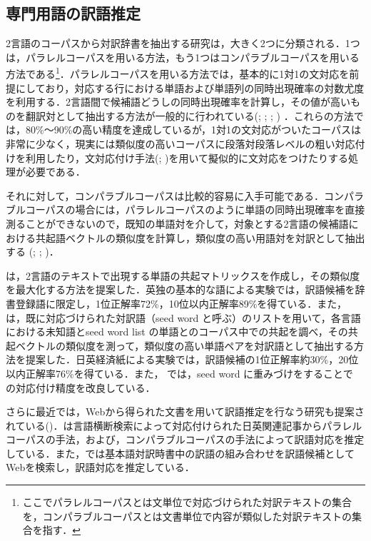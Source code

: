 \documentclass[japanese]{jnlp_1.3e}
\begin{document}
\subsection{専門用語の訳語推定}

2言語のコーパスから対訳辞書を抽出する研究は，大きく2つに分類される．1つは，パラレルコーパスを用いる方法，もう1つはコンパラブルコーパスを用いる方法である\footnote{ここでパラレルコーパスとは文単位で対応づけられた対訳テキストの集合を，コンパラブルコーパスとは文書単位で内容が類似した対訳テキストの集合を指す．}．パラレルコーパスを用いる方法では，基本的に1対1の文対応を前提にしており，対応する行における単語および単語列の同時出現確率の対数尤度を利用する．2言語間で候補語どうしの同時出現確率を計算し，その値が高いものを翻訳対として抽出する方法が一般的に行われている(\cite{Kupiec93}; \cite{Dagan_and_Church94}; \cite{Smadja93};  \cite{Kitamura_and_Matsumoto04}) ．これらの方法では，80\%〜90\%の高い精度を達成しているが，1対1の文対応がついたコーパスは非常に少なく，現実には類似度の高いコーパスに段落対段落レベルの粗い対応付けを利用したり，文対応付け手法(\cite{Gale_and_Church93}; \cite{Utiyama_and_Isahara03})を用いて擬似的に文対応をつけたりする処理が必要である．

それに対して，コンパラブルコーパスは比較的容易に入手可能である．コンパラブルコーパスの場合には，パラレルコーパスのように単語の同時出現確率を直接測ることができないので，既知の単語対を介して，対象とする2言語の候補語における共起語ベクトルの類似度を計算し，類似度の高い用語対を対訳として抽出する (\cite{Fung_and_McKeown97}; \cite{Fung_and_Yee98}; \cite{Rapp99})．

\cite{Rapp99}は，2言語のテキストで出現する単語の共起マトリックスを作成し，その類似度を最大化する方法を提案した．英独の基本的な語による実験では，訳語候補を辞書登録語に限定し，1位正解率72\%，10位以内正解率89\%を得ている．また，\cite{Fung_and_McKeown97} は，既に対応づけられた対訳語（seed word と呼ぶ）のリストを用いて，各言語における未知語とseed word list の単語とのコーパス中での共起を調べ，その共起ベクトルの類似度を測って，類似度の高い単語ペアを対訳語として抽出する方法を提案した．日英経済紙による実験では，訳語候補の1位正解率約30\%，20位以内正解率76\%を得ている．また，\cite{Fung_and_Yee98} では，seed word に重みづけをすることで \cite{Fung_and_McKeown97} の対応付け精度を改良している．

さらに最近では，Webから得られた文書を用いて訳語推定を行なう研究も提案されている(\cite{Utsuro05}\cite{Cao_and_Li02})．\cite{Utsuro05}は言語横断検索によって対応付けられた日英関連記事からパラレルコーパスの手法，および，コンパラブルコーパスの手法によって訳語対応を推定している．また，\cite{Cao_and_Li02}では基本語対訳時書中の訳語の組み合わせを訳語候補としてWebを検索し，訳語対応を推定している．
\end{document}
